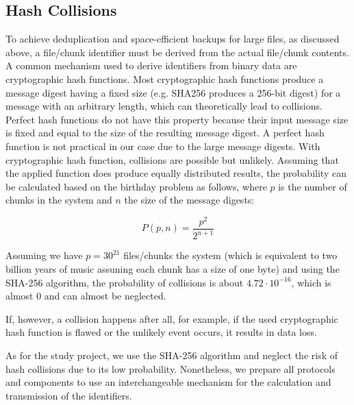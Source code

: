 \subsection{Hash Collisions}
To achieve deduplication and space-efficient backups for large files, as discussed above, a file/chunk identifier must be derived from the actual file/chunk contents. 
A common mechanism used to derive identifiers from binary data are cryptographic hash functions. Most cryptographic hash functions produce a message digest having a fixed size (e.g. SHA256 produces a 256-bit digest) for a message with an arbitrary length, which can theoretically lead to collisions.
Perfect hash functions do not have this property because their input message size is fixed and equal to the size of the resulting message digest. A perfect hash function is not practical in our case due to the large message digests.
With cryptographic hash function, collisions are possible but unlikely. Assuming that the applied function does produce equally distributed results, the probability can be calculated based on the birthday problem\cite{birthday-attack} as follows, where $p$ is the number of chunks in the system and $n$ the size of the message digests:

\[
P(p, n) = \frac{p^2}{2^{n+1}}
\]

Assuming we have $p=30^{21}$ files/chunks the system (which is equivalent to two billion years of music assuning each chunk has a size of one byte\cite{seagate-zetabyte}) and using the SHA-256 algorithm, the probability of collisions is about $4.72 \cdot 10^{-16}$, which is almost 0 and can almost be neglected.

If, however, a collision happens after all, for example, if the used cryptographic hash function is flawed or the unlikely event occurs, it results in data loss.

As for the study project, we use the SHA-256 algorithm and neglect the risk of hash collisions due to its low probability. Nonetheless, we prepare all protocols and components to use an interchangeable mechanism for the calculation and transmission of the identifiers.
